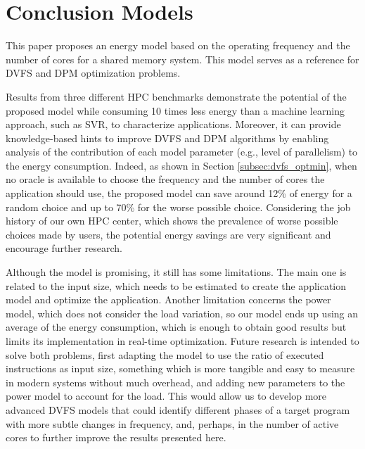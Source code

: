 \section{Conclusion Models} \label{sec:conclusion_models}
This paper proposes an energy model based on the operating frequency and the number of cores for a shared memory system. This model serves as a reference for DVFS and DPM optimization problems.

Results from three different HPC benchmarks demonstrate the potential of the proposed model while consuming 10 times less energy than a machine learning approach, such as SVR, to characterize applications. Moreover, it can provide knowledge-based hints to improve DVFS and DPM algorithms by enabling analysis of the contribution of each model parameter (e.g., level of parallelism) to the energy consumption. Indeed, as shown in Section \ref{subsec:dvfs_optmin}, when no oracle is available to choose the frequency and the number of cores the application should use, the proposed model can save around 12\% of energy for a random choice and up to 70\% for the worse possible choice. Considering the job history of our own HPC center, which shows the prevalence of worse possible choices made by users, the potential energy savings are very significant and encourage further research.

Although the model is promising, it still has some limitations. The main one is related to the input size, which needs to be estimated to create the application model and optimize the application. Another limitation concerns the power model, which does not consider the load variation, so our model ends up using an average of the energy consumption, which is enough to obtain good results but limits its implementation in real-time optimization.
Future research is intended to solve both problems, first adapting the model to use the ratio of executed instructions as input size, something which is more tangible and easy to measure in modern systems without much overhead, and adding  new parameters to the power model to account for the load. This would allow us to develop more advanced DVFS models that could identify different phases of a target program with more subtle changes in frequency, and, perhaps, in the number of active cores to  further improve the results presented here.



